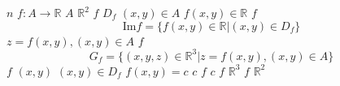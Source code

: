\documentclass{article}
\begin{document}
$n$
$f: A \to \mathbb{R}$
$A$
$\mathbb{R}^2$
$f$
$D_f$
$(x,y) \in A$
$f (x, y) \in \mathbb{R}$
$f$
$$
\text{Im} f = \{f (x,y) \in \mathbb{R} | (x,y) \in D_f\}
$$
$z = f (x, y), (x, y) \in A$
$f$
$$
G_f = \{(x,y,z) \in \mathbb{R}^3 | z = f (x, y), (x, y) \in A\}
$$
$f$
$(x,y)$
$(x,y) \in D_f$
$f (x,y) = c$
$c$
$f$
$c$
$f$
$\mathbb{R}^3$
$f$
$\mathbb{R}^2$
\end{document}
